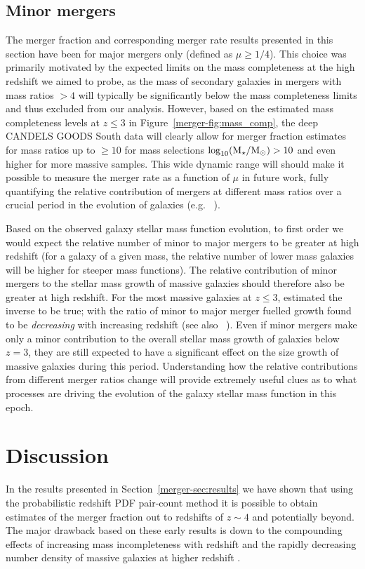 \subsection{Minor mergers}\label{merger-sec:minor}
The merger fraction and corresponding merger rate results presented in this section have been for major mergers only (defined as $\mu \geq 1/4$). This choice was primarily motivated by the expected limits on the mass completeness at the high redshift we aimed to probe, as the mass of secondary galaxies in mergers with mass ratios $>4$ will typically be significantly below the mass completeness limits and thus excluded from our analysis. However, based on the estimated mass completeness levels at $z \leq 3$ in Figure~\ref{merger-fig:mass_comp}, the deep CANDELS GOODS South data will clearly allow for merger fraction estimates for mass ratios up to $\geq 10$ for mass selections $\log_{10}(\text{M}_{\star} / \text{M}_{\odot}) > 10$ and even higher for more massive samples. This wide dynamic range will should make it possible to measure the merger rate as a function of $\mu$ in future work, fully quantifying the relative contribution of mergers at different mass ratios over a crucial period in the evolution of galaxies (e.g. \citeauthor{Bluck:2012dh}~\citeyear{Bluck:2012dh}).

Based on the observed galaxy stellar mass function evolution, to first order we would expect the relative number of minor to major mergers to be greater at high redshift (for a galaxy of a given mass, the relative number of lower mass galaxies will be higher for steeper mass functions). The relative contribution of minor mergers to the stellar mass growth of massive galaxies should therefore also be greater at high redshift. For the most massive galaxies at $z \leq 3$, \citet{Ownsworth:2014gt} estimated the inverse to be true; with the ratio of minor to major merger fuelled growth found to be \emph{decreasing} with increasing redshift (see also \citeauthor{Bluck:2012dh}~\citeyear{Bluck:2012dh}). Even if minor mergers make only a minor contribution to the overall stellar mass growth of galaxies below $z = 3$, they are still expected to have a significant effect on the size growth of massive galaxies \citep{Trujillo:2011jy,Newman:2012hp,McLure:2012hq} during this period. Understanding how the relative contributions from different merger ratios change will provide extremely useful clues as to what processes are driving the evolution of the galaxy stellar mass function in this epoch.

\section{Discussion}\label{merger-sec:discussion}
In the results presented in Section~\ref{merger-sec:results} we have shown that using the probabilistic redshift PDF pair-count method it is possible to obtain estimates of the merger fraction out to redshifts of $z\sim4$ and potentially beyond. The major drawback based on these early results is down to the compounding effects of increasing mass incompleteness with redshift and the rapidly decreasing number density of massive galaxies at higher redshift \citep{Duncan:2014gh,Grazian:2014vx}. 

